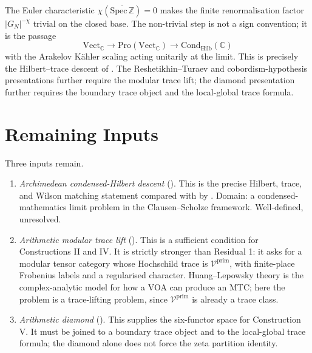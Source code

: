 The Euler characteristic
\(\chi(\overline{\mathrm{Spec}\,\mathbb Z})=0\) makes the finite
renormalisation factor \(|G_N|^{-\chi}\) trivial on the closed base.
The non-trivial step is not a sign convention; it is the passage
\[
\mathrm{Vect}_{\mathbb C}
\longrightarrow \mathrm{Pro}(\mathrm{Vect}_{\mathbb C})
\longrightarrow \mathrm{Cond}_{\mathrm{Hilb}}(\mathbb C)
\]
with the Arakelov K\"ahler scaling acting unitarily at the limit.
This is precisely the Hilbert--trace descent of
. The
Reshetikhin--Turaev and cobordism-hypothesis presentations further
require the modular trace lift; the diamond presentation further
requires the boundary trace object and the local-global trace formula.

\section{Remaining Inputs}
\label{v4-arith:w10-a:residual}

Three inputs remain.

\begin{enumerate}
\item \emph{Archimedean condensed-Hilbert descent}
(). This is the precise
Hilbert, trace, and Wilson matching statement compared with
 by
. Domain: a
condensed-mathematics limit problem in the Clausen--Scholze
framework. Well-defined, unresolved.

\item \emph{Arithmetic modular trace lift}
(). This is a sufficient
condition for Constructions II and IV. It is strictly stronger than
Residual 1: it asks for a modular tensor category whose Hochschild
trace is \(\mathcal V^{\mathrm{prim}}\), with finite-place Frobenius
labels and a regularised character. Huang--Lepowsky theory is the
complex-analytic model for how a VOA can produce an MTC; here the
problem is a trace-lifting problem, since
\(\mathcal V^{\mathrm{prim}}\) is already a trace class.

\item \emph{Arithmetic diamond}
(). This supplies the
six-functor space for Construction V. It must be joined to a boundary
trace object and to the local-global trace formula; the diamond alone
does not force the zeta partition identity.
\end{enumerate}

